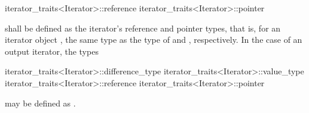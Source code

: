 \documentclass[american,twoside]{book}
\begin{document}
\begin{codeblock}
iterator_traits<Iterator>::reference
iterator_traits<Iterator>::pointer
\end{codeblock}

shall be defined as the iterator's reference and pointer types, that is, for an
iterator object , the same type as the type of  and ,
respectively. In the case of an output iterator, the types

\begin{codeblock}
iterator_traits<Iterator>::difference_type
iterator_traits<Iterator>::value_type
iterator_traits<Iterator>::reference
iterator_traits<Iterator>::pointer
\end{codeblock}

may be defined as .
\end{document}
